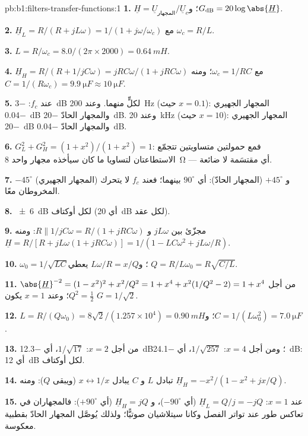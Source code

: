 \begin{solution}{pb:b1:filters-transfer-functions:1}
\textbf{1.} $\underline H = \underline U_{\text{المجهار}}/\underline U_e$؛
و$G_{\mathrm{dB}} = 20\log\abs{\underline H}$.

\textbf{2.} $\underline H_L = R/(R + jL\omega) = 1/(1 + j\omega/\omega_c)$ مع
$\omega_c = R/L$.

\textbf{3.} $L = R/\omega_c = 8.0/(2\pi \times 2000) = \qty{0.64}{mH}$.

\textbf{4.} $\underline H_H = R/(R + 1/jC\omega) = jRC\omega/(1 + jRC\omega)$ مع
$\omega_c = 1/RC$؛ ومنه $C = 1/(R\omega_c) = \qty{9.9}{\micro F} \approx
\qty{10}{\micro F}$.

\textbf{5.} عند $f_c$: \qty{-3}{dB} لكلٍّ منهما. وعند \qty{200}{Hz} (حيث $x = 0.1$): المجهار الجهيري
\qty{-0.04}{dB} والمجهار الحادّ \qty{-20}{dB}. وعند \qty{20}{kHz} (حيث $x = 10$): المجهار الجهيري
\qty{-20}{dB} والمجهار الحادّ \qty{-0.04}{dB}.

\textbf{6.} $G_L^2 + G_H^2 = (1 + x^2)/(1 + x^2) = 1$: فمع حمولتين متساويتين
تتجمّع الاستطاعتان لتساويا ما كان سيأخذه مجهار واحد \qty{8}{\ohm}
--- أي مقتسَمة لا ضائعة.

\textbf{7.} $-45^\circ$ (المجهار الجهيري) و $+45^\circ$ (المجهار الحادّ): أي $90^\circ$
بينهما؛ فعند $f_c$ لا يتحرك المخروطان معًا.

\textbf{8.} \qty{\pm 6}{dB} لكل أوكتاف (أي \qty{20}{dB} لكل عقد).

\textbf{9.} مجزّئ بين $jL\omega$ و $R \parallel 1/jC\omega =
R/(1 + jRC\omega)$: ومنه $\underline H = R/[R + jL\omega(1 + jRC\omega)] =
1/(1 - LC\omega^2 + jL\omega/R)$.

\textbf{10.} $\omega_0 = 1/\sqrt{LC}$؛ و$L\omega/R = x/Q$ يعطي $Q =
R/L\omega_0 = R\sqrt{C/L}$.

\textbf{11.} $\abs{\underline H}^{-2} = (1 - x^2)^2 + x^2/Q^2 = 1 + x^4 +
x^2(1/Q^2 - 2) = 1 + x^4$ من أجل $Q^2 = \tfrac12$؛ وعند $x = 1$ يكون $G = 1/\sqrt2$.

\textbf{12.} $L = R/(Q\omega_0) = 8\sqrt2/(1.257\times10^4) = \qty{0.90}{mH}$؛
و$C = 1/(L\omega_0^2) = \qty{7.0}{\micro F}$.

\textbf{13.} من أجل $x = 2$: $1/\sqrt{17}$، أي \qty{-12.3}{dB}؛ ومن أجل $x = 4$: $1/\sqrt{257}$،
أي \qty{-24.1}{dB}: أي \qty{12}{dB} لكل أوكتاف.

\textbf{14.} تبادل $L$ و $C$ يبادل $x \leftrightarrow 1/x$ (ويبقى
$Q$): ومنه $\underline H_H = -x^2/(1 - x^2 + jx/Q)$.

\textbf{15.} عند $x = 1$: $\underline H_L = Q/j = -jQ$ (أي $-90^\circ$)، و
$\underline H_H = jQ$ (أي $+90^\circ$): فالمجهاران في تعاكس
طور عند تواتر الفصل وكانا سيتلاشيان صوتيًّا؛ ولذلك يُوصَّل المجهار الحادّ
بقطبية معكوسة.


\end{solution}
